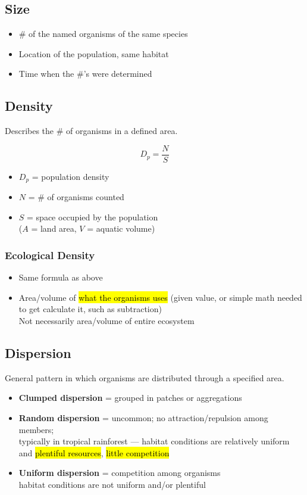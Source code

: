 \documentclass[a4paper,12pt]{article}
\begin{document}
\subsection{Size}
\begin{itemize}
    \item{\# of the named organisms of the same species}
    \item{Location of the population, same habitat}
    \item{Time when the \#'s were determined}
\end{itemize}

\subsection{Density}
Describes the \# of organisms in a defined area.

\Huge
$$D_p = \frac{N}{S}$$
\normalsize
\begin{itemize}
    \item{$D_p$ = population density}
    \item{$N$ = \# of organisms counted}
    \item{$S$ = space occupied by the population \\ ($A$ = land area, $V$ = aquatic volume)}
\end{itemize}

\subsubsection{Ecological Density}
\begin{itemize}
    \item{Same formula as above}
    \item{Area/volume of \hl{what the organisms uses} (given value, or simple math needed to get calculate it, such as subtraction) \\ Not necessarily area/volume of entire ecosystem}
\end{itemize}

\subsection{Dispersion}
General pattern in which organisms are distributed through a specified area.
\begin{itemize}
    \item{\textbf{Clumped dispersion} = grouped in patches or aggregations}
    \item{\textbf{Random dispersion} = uncommon; no attraction/repulsion among members; \\ typically in tropical rainforest --- habitat conditions are relatively uniform and \hl{plentiful resources}, \hl{little competition}}
    \item{\textbf{Uniform dispersion} = competition among organisms \\ habitat conditions are not uniform and/or plentiful}
\end{itemize}
\end{document}
